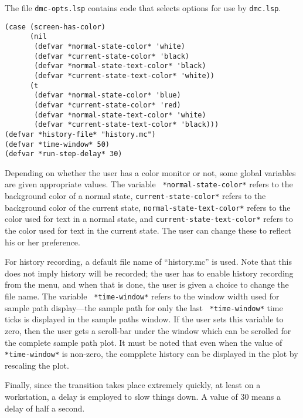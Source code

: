 The file {\tt dmc-opts.lsp} contains code that selects options for use
by {\tt dmc.lsp}. 
\begin{verbatim}
(case (screen-has-color)
      (nil
       (defvar *normal-state-color* 'white)
       (defvar *current-state-color* 'black)
       (defvar *normal-state-text-color* 'black)
       (defvar *current-state-text-color* 'white))
      (t 
       (defvar *normal-state-color* 'blue)
       (defvar *current-state-color* 'red)
       (defvar *normal-state-text-color* 'white)
       (defvar *current-state-text-color* 'black)))
(defvar *history-file* "history.mc")
(defvar *time-window* 50)
(defvar *run-step-delay* 30)
\end{verbatim}
Depending on whether the user has a color monitor or not, some global
variables are given appropriate values. The variable {\tt
  *normal-state-color*} refers to the background color of a normal
state, {\tt *current-state-color*} refers to the background color of
the current state, {\tt normal-state-text-color*} refers to the color
used for text in a normal state, and {\tt *current-state-text-color*}
refers to the color used for text in the current state.  The user can
change these to reflect his or her preference.  

For history recording, a default file name of ``history.mc'' is used.
Note that this does not imply history will be recorded; the user has
to enable history recording from the menu, and when that is done, the
user is given a choice to change the file name. The variable {\tt
  *time-window*} refers to the window width used for
sample path display---the sample path for only the last {\tt
  *time-window*} time ticks is displayed in the sample paths window.
If the user sets this variable to zero, then the user gets a
scroll-bar under the window which can be scrolled for the complete
sample path plot.  It must be noted that even when the value of {\tt
  *time-window*} is non-zero, the compplete history can be displayed
in the plot by rescaling the plot. 

Finally, since the transition takes place extremely quickly, at least
on a workstation, a delay is employed to slow things down.  A value of
$30$ means a delay of half a second. 

